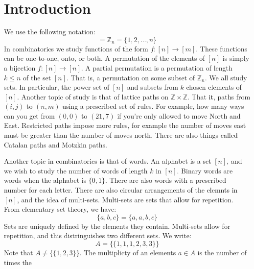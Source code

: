 \documentclass[crop=false,class=book,oneside]{standalone}                      %
\begin{document}
    \section{Introduction}
        We use the following notation:
        \begin{equation}
            [n]=\mathbb{Z}_{n}=\{1,2,\hdots,n\}
        \end{equation}
        In combinatorics we study functions of the form
        $f:[n]\rightarrow[m]$. These functions can be
        one-to-one, onto, or both. A permutation of the
        elements of $[n]$ is simply a bijection
        $f:[n]\rightarrow[n]$. A partial permutation is a
        permutation of length $k\leq{n}$ of the set
        $[n]$. That is, a permutation on some subset of
        $\mathbb{Z}_{n}$. We all study sets. In particular,
        the power set of $[n]$ and subsets from $k$ chosen
        elements of $[n]$. Another topic of study is that of
        lattice paths on $\mathbb{Z}\times\mathbb{Z}$. That
        it, paths from $(i,j)$ to $(n,m)$ using a prescribed
        set of rules. For example, how many ways can you get
        from $(0,0)$ to $(21,7)$ if you're only allowed to move
        North and East. Restricted paths impose more rules,
        for example the number of moves east must be greater
        than the number of moves north. There are also things
        called Catalan paths and Motzkin paths.
        \par\hfill\par
        Another topic in combinatorics is that of words. An
        alphabet is a set $[n]$, and we wish to study the number
        of words of length $k$ in $[n]$. Binary words are words
        when the alphabet is $\{0,1\}$. There are also words
        with a prescribed number for each letter.
        There are also circular arrangements of the elemnts
        in $[n]$, and the idea of multi-sets. Multi-sets
        are sets that allow for repetition. From elementary
        set theory, we have:
        \begin{equation}
            \{a,b,c\}=\{a,a,b,c\}
        \end{equation}
        Sets are uniquely defined by the elements they contain.
        Multi-sets allow for repetition, and this distringuishes
        two different sets. We write:
        \begin{equation}
            A=\{\{1,1,1,2,3,3\}\}
        \end{equation}
        Note that $A\ne\{\{1,2,3\}\}$. The multiplicty of
        an elements $a\in{A}$ is the number of times the
\end{document}
